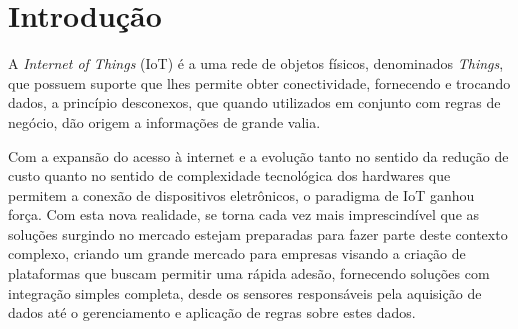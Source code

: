 \section{Introdução}
A \textit{Internet of Things} (IoT) é a uma rede de objetos físicos, denominados
\textit{Things}, que possuem suporte que lhes permite obter conectividade,
fornecendo e trocando dados, a princípio desconexos, que quando
utilizados em conjunto com regras de negócio, dão origem a informações de grande
valia.

Com a expansão do acesso à internet e a evolução tanto no sentido da redução de
custo quanto no sentido de complexidade tecnológica dos hardwares que permitem
a conexão de dispositivos eletrônicos, o paradigma de IoT ganhou força.
Com esta nova realidade, se torna cada vez mais imprescindível que as soluções
surgindo no mercado estejam preparadas para fazer parte deste contexto complexo,
criando um grande mercado para empresas visando a criação de plataformas que buscam
permitir uma rápida adesão, fornecendo soluções com integração simples completa,
desde os sensores responsáveis pela aquisição de dados até o gerenciamento e aplicação
de regras sobre estes dados.
